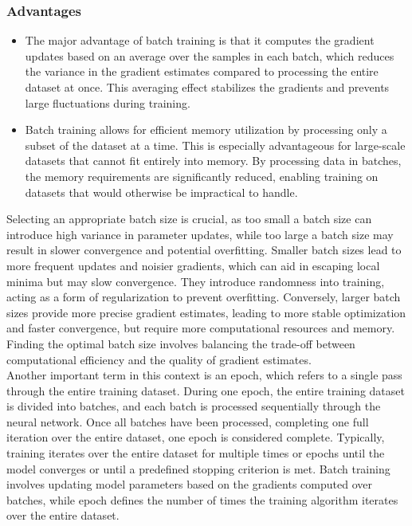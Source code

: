 \subsubsection{Advantages}
\begin{itemize}
    \item The major advantage of batch training is that it computes the gradient updates based on an average over the samples in each batch, which reduces the variance in the gradient estimates compared to processing the entire dataset at once. This averaging effect stabilizes the gradients and prevents large fluctuations during training. 
    \item Batch training allows for efficient memory utilization by processing only a subset of the dataset at a time. This is especially advantageous for large-scale datasets that cannot fit entirely into memory. By processing data in batches, the memory requirements are significantly reduced, enabling training on datasets that would otherwise be impractical to handle. 
\end{itemize}
Selecting an appropriate batch size is crucial, as too small a batch size can introduce high variance in parameter updates, while too large a batch size may result in slower convergence and potential overfitting. Smaller batch sizes lead to more frequent updates and noisier gradients, which can aid in escaping local minima but may slow convergence. They introduce randomness into training, acting as a form of regularization to prevent overfitting. Conversely, larger batch sizes provide more precise gradient estimates, leading to more stable optimization and faster convergence, but require more computational resources and memory. Finding the optimal batch size involves balancing the trade-off between computational efficiency and the quality of gradient estimates. \\                     
Another important term in this context is an epoch, which refers to a single pass through the entire training dataset. During one epoch, the entire training dataset is divided into batches, and each batch is processed sequentially through the neural network. Once all batches have been processed, completing one full iteration over the entire dataset, one epoch is considered complete. Typically, training iterates over the entire dataset for multiple times or epochs until the model converges or until a predefined stopping criterion is met. Batch training involves updating model parameters based on the gradients computed over batches, while epoch defines the number of times the training algorithm iterates over the entire dataset. \\
